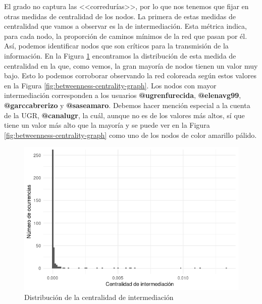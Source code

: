 El grado no captura las <<corredurías>>, por lo que nos tenemos que fijar en
otras medidas de centralidad de los nodos. La primera de estas medidas de
centralidad que vamos a observar es la de intermediación. Esta métrica indica,
para cada nodo, la proporción de caminos mínimos de la red que pasan por él.
Así, podemos identificar nodos que son críticos para la transmisión de la
información. En la Figura \ref{fig:betweenness-centrality-plot} encontramos la
distribución de esta medida de centralidad en la que, como vemos, la gran
mayoría de nodos tienen un valor muy bajo. Esto lo podemos corroborar observando
la red coloreada según estos valores en la Figura
\ref{fig:betweenness-centrality-graph}. Los nodos con mayor intermediación
corresponden a los usuarios \textbf{@ugrenfurecida}, \textbf{@elenavg99},
\textbf{@garccabrerizo} y \textbf{@saseamaro}. Debemos hacer mención especial a
la cuenta de la UGR, \textbf{@canalugr}, la cuál, aunque no es de los valores
más altos, sí que tiene un valor más alto que la mayoría y se puede ver en la
Figura \ref{fig:betweenness-centrality-graph} como uno de los nodos de color
amarillo pálido.

\begin{figure}
    \centering
    \includegraphics[width=\textwidth]{images/plots/betweenness-centrality.png}
    \caption{Distribución de la centralidad de intermediación}
    \label{fig:betweenness-centrality-plot}
\end{figure}

